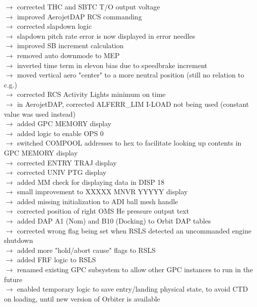 \documentclass[Space_Shuttle_Vessel_Manual.tex]{subfiles}
\begin{document}
$\rightarrow$ corrected THC and SBTC T/O output voltage\\
$\rightarrow$ improved AerojetDAP RCS commanding\\
$\rightarrow$ corrected slapdown logic\\
$\rightarrow$ slapdown pitch rate error is now displayed in error needles\\
$\rightarrow$ improved SB increment calculation\\
$\rightarrow$ removed auto downmode to MEP\\
$\rightarrow$ inverted time term in elevon bias due to speedbrake increment\\
$\rightarrow$ moved vertical aero "center" to a more neutral position (still no relation to c.g.)\\
$\rightarrow$ corrected RCS Activity Lights minimum on time\\
$\rightarrow$ in AerojetDAP, corrected ALFERR\_LIM I-LOAD not being used (constant value was used instead)\\
$\rightarrow$ added GPC MEMORY display\\
$\rightarrow$ added logic to enable OPS 0\\
$\rightarrow$ switched COMPOOL addresses to hex to facilitate looking up contents in GPC MEMORY display\\
$\rightarrow$ corrected ENTRY TRAJ display\\
$\rightarrow$ corrected UNIV PTG display\\
$\rightarrow$ added MM check for displaying data in DISP 18\\
$\rightarrow$ small improvement to XXXXX MNVR YYYYY display\\
$\rightarrow$ added missing initialization to ADI ball mesh handle\\
$\rightarrow$ corrected position of right OMS He pressure output text\\
$\rightarrow$ added DAP A1 (Nom) and B10 (Docking) to Orbit DAP tables\\
$\rightarrow$ corrected wrong flag being set when RSLS detected an uncommanded engine shutdown\\
$\rightarrow$ added more "hold/abort cause" flags to RSLS\\
$\rightarrow$ added FRF logic to RSLS\\
$\rightarrow$ renamed existing GPC subsystem to allow other GPC instances to run in the future\\
$\rightarrow$ enabled temporary logic to save entry/landing physical state, to avoid CTD on loading, until new version of Orbiter is available\\
\end{document}
